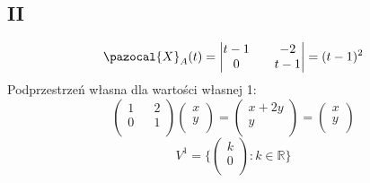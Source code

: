 \documentclass{article}
\begin{document}
\subsection*{II}
$$\pazocal{X}_A(t) = 
\begin{vmatrix}
t-1 && -2\\
0 && t-1\\
\end{vmatrix}
= (t-1)^2
$$
Podprzestrzeń własna dla wartości własnej 1:
$$
\begin{pmatrix}
1 && 2\\
0 && 1\\
\end{pmatrix}
\begin{pmatrix}
x\\
y\\
\end{pmatrix} =
\begin{pmatrix}
x + 2y\\
y\\
\end{pmatrix} = 
\begin{pmatrix}
x\\
y\\
\end{pmatrix}
$$
$$
V^1 = \{\begin{pmatrix}
k\\
0\\
\end{pmatrix} : k \in \mathbb{R}\}
$$
\end{document}
